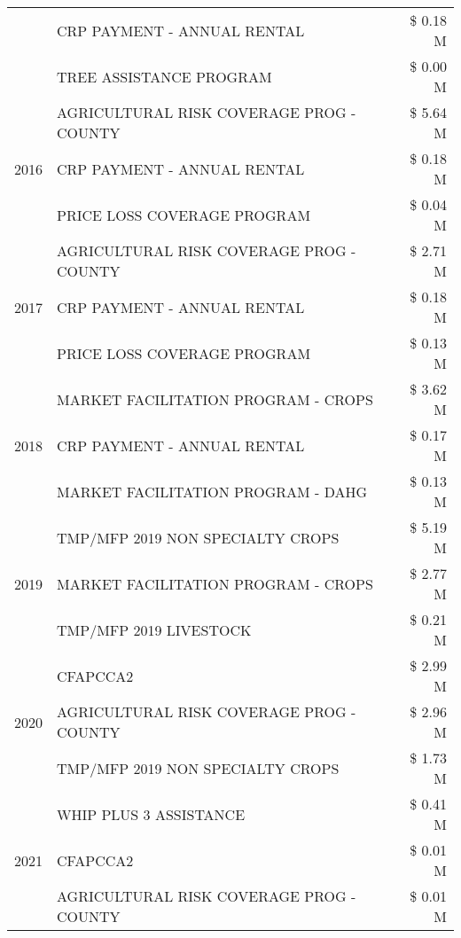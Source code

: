\begin{tabular}{llr}
 & CRP PAYMENT - ANNUAL RENTAL & \$ 0.18 M \\
 & TREE ASSISTANCE PROGRAM & \$ 0.00 M \\
\cline{1-3}
\multirow[t]{3}{*}{2016} & AGRICULTURAL RISK COVERAGE PROG - COUNTY & \$ 5.64 M \\
 & CRP PAYMENT - ANNUAL RENTAL & \$ 0.18 M \\
 & PRICE LOSS COVERAGE PROGRAM & \$ 0.04 M \\
\cline{1-3}
\multirow[t]{3}{*}{2017} & AGRICULTURAL RISK COVERAGE PROG - COUNTY & \$ 2.71 M \\
 & CRP PAYMENT - ANNUAL RENTAL & \$ 0.18 M \\
 & PRICE LOSS COVERAGE PROGRAM & \$ 0.13 M \\
\cline{1-3}
\multirow[t]{3}{*}{2018} & MARKET FACILITATION PROGRAM - CROPS & \$ 3.62 M \\
 & CRP PAYMENT - ANNUAL RENTAL & \$ 0.17 M \\
 & MARKET FACILITATION PROGRAM - DAHG & \$ 0.13 M \\
\cline{1-3}
\multirow[t]{3}{*}{2019} & TMP/MFP 2019 NON SPECIALTY CROPS & \$ 5.19 M \\
 & MARKET FACILITATION PROGRAM - CROPS & \$ 2.77 M \\
 & TMP/MFP 2019 LIVESTOCK & \$ 0.21 M \\
\cline{1-3}
\multirow[t]{3}{*}{2020} & CFAPCCA2 & \$ 2.99 M \\
 & AGRICULTURAL RISK COVERAGE PROG - COUNTY & \$ 2.96 M \\
 & TMP/MFP 2019 NON SPECIALTY CROPS & \$ 1.73 M \\
\cline{1-3}
\multirow[t]{3}{*}{2021} & WHIP PLUS 3 ASSISTANCE & \$ 0.41 M \\
 & CFAPCCA2 & \$ 0.01 M \\
 & AGRICULTURAL RISK COVERAGE PROG - COUNTY & \$ 0.01 M \\
\cline{1-3}
\bottomrule
\end{tabular}
